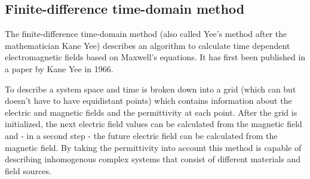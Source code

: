 \subsection{Finite-difference time-domain method}


The finite-difference time-domain method (also called Yee's method after the mathematician Kane Yee) describes an algorithm to calculate time dependent electromagnetic fields based on Maxwell's equations. It has first been published in a paper by Kane Yee in 1966\cite{yee}.

To describe a system space and time is broken down into a grid (which can but doesn't have to have equidistant points) which contains information about the electric and magnetic fields and the permittivity at each point. After the grid is initialized, the next electric field values can be calculated from the magnetic field and - in a second step - the future electric field can be calculated from the magnetic field. By taking the permittivity into account this method is capable of describing inhomogenous complex systems that consist of different materials and field sources.

